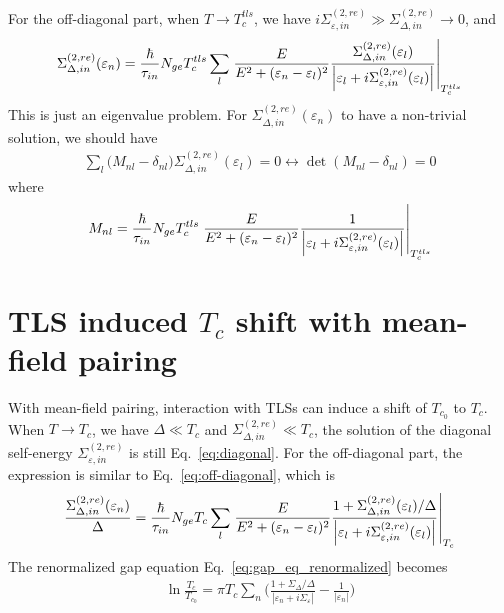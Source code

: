 \documentclass[]{article}
\begin{document}
For the off-diagonal part, when $T \rightarrow T_c^{tls}$,
we have $i\Sigma_{\varepsilon,in}^{(2,re)} \gg \Sigma_{\Delta,in}^{(2,re)} \rightarrow 0$, and
\begin{align}
    \Sigma_{\Delta,in}^{(2,re)}(\varepsilon_n)
    = \frac{\hbar}{\tau_{in}}N_{ge}T_c^{tls}\sum_l\eval{\frac{E}{E^2+(\varepsilon_n-\varepsilon_l)^2}
    \frac{\Sigma_{\Delta,in}^{(2,re)}(\varepsilon_l)}
    {\left|\varepsilon_l + i\Sigma_{\varepsilon,in}^{(2,re)}(\varepsilon_l)\right|}}_{T_c^{tls}} \label{eq:off-diagonal}
\end{align}
This is just an eigenvalue problem. For $\Sigma_{\Delta,in}^{(2,re)}(\varepsilon_n)$ to have a non-trivial solution,
we should have
\begin{align}
    \sum_l \bigg(M_{nl} - \delta_{nl}\bigg) \Sigma_{\Delta,in}^{(2,re)}(\varepsilon_l) = 0
    \leftrightarrow
    \det(M_{nl} - \delta_{nl}) = 0
\end{align}
where
\begin{align}
    M_{nl} = 
    \frac{\hbar}{\tau_{in}}N_{ge}T_c^{tls}\eval{\frac{E}{E^2+(\varepsilon_n-\varepsilon_l)^2}
    \frac{1}{\left|\varepsilon_l + i\Sigma_{\varepsilon,in}^{(2,re)}(\varepsilon_l)\right|}}_{T_c^{tls}}
\end{align}

\section{TLS induced $T_c$ shift with mean-field pairing}
With mean-field pairing, interaction with TLSs can induce a shift of $T_{c_0}$ to $T_c$.
When $T \rightarrow T_c$, we have $\Delta \ll T_c$ and $\Sigma_{\Delta,in}^{(2,re)} \ll T_c$,
the solution of the diagonal self-energy $\Sigma_{\varepsilon,in}^{(2,re)}$ is still Eq.~\eqref{eq:diagonal}.
For the off-diagonal part, the expression is similar to Eq.~\eqref{eq:off-diagonal}, which is
\begin{align}
    \frac{\Sigma_{\Delta,in}^{(2,re)}(\varepsilon_n)}{\Delta}
    = \frac{\hbar}{\tau_{in}}N_{ge}T_c\sum_l\eval{\frac{E}{E^2+(\varepsilon_n-\varepsilon_l)^2}
    \frac{1 + \Sigma_{\Delta,in}^{(2,re)}(\varepsilon_l)/\Delta}
    {\left|\varepsilon_l + i\Sigma_{\varepsilon,in}^{(2,re)}(\varepsilon_l)\right|}}_{T_c}
\end{align}
The renormalized gap equation Eq.~\eqref{eq:gap_eq_renormalized} becomes
\begin{align}
    \ln\frac{T_c}{T_{c_0}} = \pi T_c\sum_n
    \Bigg(\frac{1 + \Sigma_\Delta/\Delta}{|\varepsilon_n + i\Sigma_\varepsilon|}
    - \frac{1}{|\varepsilon_n|}\Bigg)
\end{align}
\end{document}
